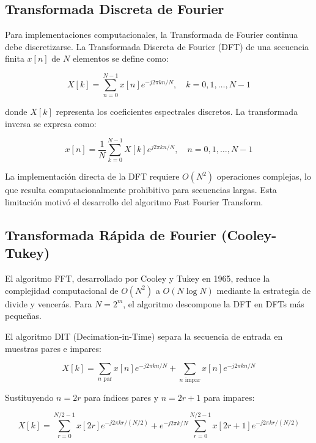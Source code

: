 \documentclass[a4paper]{article}
\begin{document}
\subsection{Transformada Discreta de Fourier}

Para implementaciones computacionales, la Transformada de Fourier continua debe discretizarse. La Transformada Discreta de Fourier (DFT) de una secuencia finita $x[n]$ de $N$ elementos se define como:

\begin{equation}
X[k] = \sum_{n=0}^{N-1} x[n] e^{-j2\pi kn/N}, \quad k = 0, 1, \ldots, N-1
\end{equation}

donde $X[k]$ representa los coeficientes espectrales discretos. La transformada inversa se expresa como:

\begin{equation}
x[n] = \frac{1}{N} \sum_{k=0}^{N-1} X[k] e^{j2\pi kn/N}, \quad n = 0, 1, \ldots, N-1
\end{equation}

La implementación directa de la DFT requiere $O(N^2)$ operaciones complejas, lo que resulta computacionalmente prohibitivo para secuencias largas. Esta limitación motivó el desarrollo del algoritmo Fast Fourier Transform.

\subsection{Transformada Rápida de Fourier (Cooley-Tukey)}

El algoritmo FFT, desarrollado por Cooley y Tukey en 1965, reduce la complejidad computacional de $O(N^2)$ a $O(N \log N)$ mediante la estrategia de divide y vencerás. Para $N = 2^m$, el algoritmo descompone la DFT en DFTs más pequeñas.

El algoritmo DIT (Decimation-in-Time) separa la secuencia de entrada en muestras pares e impares:

\begin{equation}
X[k] = \sum_{n \text{ par}} x[n] e^{-j2\pi kn/N} + \sum_{n \text{ impar}} x[n] e^{-j2\pi kn/N}
\end{equation}

Sustituyendo $n = 2r$ para índices pares y $n = 2r+1$ para impares:

\begin{equation}
X[k] = \sum_{r=0}^{N/2-1} x[2r] e^{-j2\pi kr/(N/2)} + e^{-j2\pi k/N} \sum_{r=0}^{N/2-1} x[2r+1] e^{-j2\pi kr/(N/2)}
\end{equation}
\end{document}
